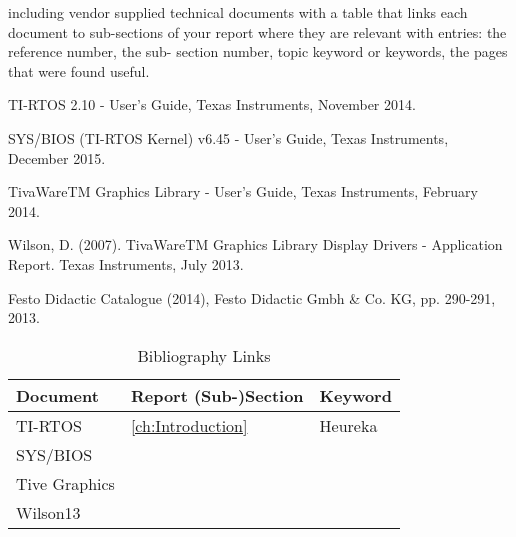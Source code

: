 \begin{thebibliography}{9}

 including vendor supplied technical documents with a table that links each document to sub-sections of your report where they are relevant with entries: the reference number, the sub- section number, topic keyword or keywords, the pages that were found useful.

TI-RTOS 2.10 - User's Guide, Texas Instruments, November 2014.

SYS/BIOS (TI-RTOS Kernel) v6.45 - User's Guide, Texas Instruments, December 2015.

TivaWareTM Graphics Library - User's Guide, Texas Instruments, February 2014.

Wilson, D. (2007). TivaWareTM Graphics Library Display Drivers - Application Report. Texas 
Instruments, July 2013.

Festo Didactic Catalogue (2014), Festo Didactic Gmbh \& Co. KG, pp. 290-291, 2013.
 
\end{thebibliography}

\begin{table}[H]
	\begin{tabularx}{\textwidth}{l | l | X}
		Document & Report (Sub-)Section & Keyword \\
		\hline
		TI-RTOS & \ref{ch:Introduction} & Heureka\\
		\hline
		SYS/BIOS & & \\
		\hline
		Tive Graphics & & \\
		\hline
		Wilson13 & & \\	
	\end{tabularx}
	\caption{Bibliography Links}
	\label{tab:BibliographyLinks}
\end{table}

\vfill